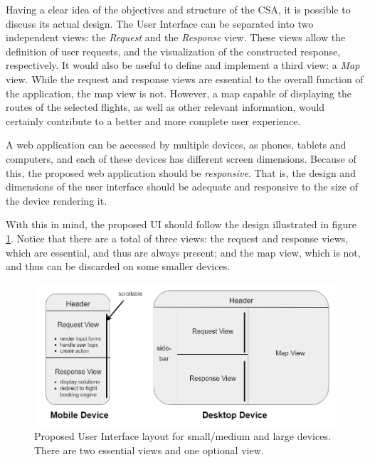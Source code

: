 Having a clear idea of the objectives and structure of the CSA, it is possible to discuss its actual design. The User Interface can be separated into two independent views: the \textit{Request} and the \textit{Response} view. These views allow the definition of user requests, and the visualization of the constructed response,  respectively. It would also be useful to define and implement a third view: a \textit{Map} view. While the request and response views are essential to the overall function of the application, the map view is not. However, a map capable of displaying the routes of the selected flights, as well as other relevant information, would certainly contribute to a better and more complete user experience.

A web application can be accessed by multiple devices, as phones, tablets and computers, and each of these devices has different screen dimensions. Because of this, the proposed web application should be \textit{responsive}. That is, the design and dimensions of the user interface should be adequate and responsive to the size of the device rendering it.

With this in mind, the proposed UI should follow the design illustrated in figure \ref{fig:UI_design}. Notice that there are a total of three views: the request and response views, which are essential, and thus are always present; and the map view, which is not, and thus can be discarded on some smaller devices.

\begin{figure}[htpb]
  \centering
  \includegraphics[width=\textwidth]{./Figures/system_design/UI_design.png}
  \caption{Proposed User Interface layout for small/medium and large devices. 
  There are two essential views and one optional view.}
  \label{fig:UI_design}
\end{figure}
